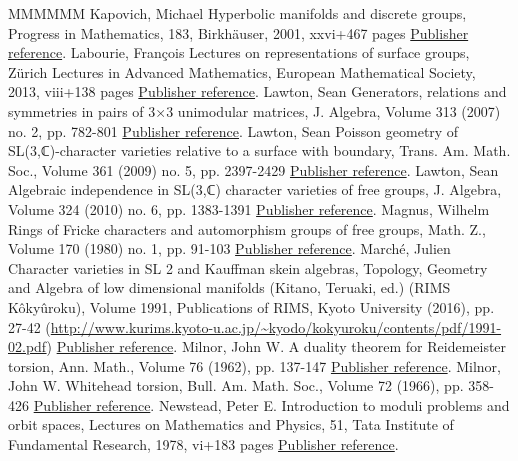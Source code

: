 \begin{thebibliography}{MMMMMM}
 Kapovich, Michael Hyperbolic manifolds and discrete groups, Progress in Mathematics, 183, Birkhäuser, 2001, xxvi+467 pages \href{https://ahl.centre-mersenne.org/item/AHL_2020__3__341_0/#Kapovich}{Publisher reference}.
 Labourie, François Lectures on representations of surface groups, Zürich Lectures in Advanced Mathematics, European Mathematical Society, 2013, viii+138 pages \href{https://ahl.centre-mersenne.org/item/AHL_2020__3__341_0/#LabourieSG}{Publisher reference}.
 Lawton, Sean Generators, relations and symmetries in pairs of 3×3 unimodular matrices, J. Algebra, Volume 313 (2007) no. 2, pp. 782-801 \href{https://ahl.centre-mersenne.org/item/AHL_2020__3__341_0/#LawtonJA}{Publisher reference}.
 Lawton, Sean Poisson geometry of SL(3,ℂ)-character varieties relative to a surface with boundary, Trans. Am. Math. Soc., Volume 361 (2009) no. 5, pp. 2397-2429 \href{https://ahl.centre-mersenne.org/item/AHL_2020__3__341_0/#LawtonP}{Publisher reference}.
 Lawton, Sean Algebraic independence in SL(3,ℂ) character varieties of free groups, J. Algebra, Volume 324 (2010) no. 6, pp. 1383-1391 \href{https://ahl.centre-mersenne.org/item/AHL_2020__3__341_0/#LawtonAI}{Publisher reference}.
 Magnus, Wilhelm Rings of Fricke characters and automorphism groups of free groups, Math. Z., Volume 170 (1980) no. 1, pp. 91-103 \href{https://ahl.centre-mersenne.org/item/AHL_2020__3__341_0/#Magnus}{Publisher reference}.
 Marché, Julien Character varieties in SL 2  and Kauffman skein algebras, Topology, Geometry and Algebra of low dimensional manifolds (Kitano, Teruaki, ed.) (RIMS Kôkyûroku), Volume 1991, Publications of RIMS, Kyoto University (2016), pp. 27-42 (\url{http://www.kurims.kyoto-u.ac.jp/~kyodo/kokyuroku/contents/pdf/1991-02.pdf}) \href{https://ahl.centre-mersenne.org/item/AHL_2020__3__341_0/#Marche2016}{Publisher reference}.
 Milnor, John W. A duality theorem for Reidemeister torsion, Ann. Math., Volume 76 (1962), pp. 137-147 \href{https://ahl.centre-mersenne.org/item/AHL_2020__3__341_0/#MilnorDuality}{Publisher reference}.
 Milnor, John W. Whitehead torsion, Bull. Am. Math. Soc., Volume 72 (1966), pp. 358-426 \href{https://ahl.centre-mersenne.org/item/AHL_2020__3__341_0/#MilnorBullAMS}{Publisher reference}.
 Newstead, Peter E. Introduction to moduli problems and orbit spaces, Lectures on Mathematics and Physics, 51, Tata Institute of Fundamental Research, 1978, vi+183 pages \href{https://ahl.centre-mersenne.org/item/AHL_2020__3__341_0/#Newstead}{Publisher reference}.

\end{thebibliography}
